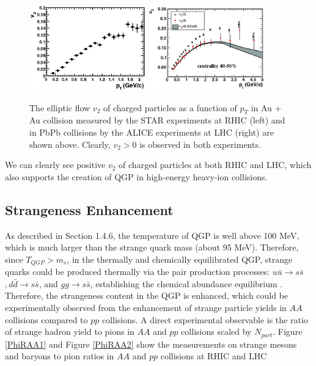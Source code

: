 \begin{figure}[hbtp]
\begin{center}
\includegraphics[width=0.45\textwidth]{Figures/Chapter1/STARV2Plot.eps}
\includegraphics[width=0.45\textwidth]{Figures/Chapter1/ALICEV2Plot.png}
\caption{The elliptic flow $v_2$ of charged particles as a function of $p_T$ in Au + Au collision measured by the STAR experiments at RHIC (left) and in PbPb collisions by the ALICE experiments at LHC (right) are shown above. Clearly, $v_2 > 0$ is observed in both experiments.}
\label{V2}
\end{center}
\end{figure}   

We can clearly see positive $v_2$ of charged particles at both RHIC and LHC, which also supports the creation of QGP in high-energy heavy-ion collisions.  
 
\subsection{Strangeness Enhancement} 

As described in Section 1.4.6, the temperature of QGP is well above 100 MeV, which is much larger than the strange quark mass (about 95 MeV). Therefore, since $T_{QGP} > m_s$, in the thermally and chemically equilibrated QGP, strange quarks could be produced thermally via the pair production processes: $u \bar u \rightarrow s\bar s$$, d \bar d \rightarrow s\bar s$, and $gg \rightarrow s \bar s$, establishing the chemical abundance equilibrium \cite{SSEnhance}. Therefore, the strangeness content in the QGP is enhanced, which could be experimentally observed from the enhancement of strange particle yields in $AA$ collisions compared to $pp$ collisions. A direct experimental observable is the ratio of strange hadron yield to pions in $AA$ and $pp$ collisions scaled by $N_{part}$. Figure \ref{PhiRAA1} and Figure \ref{PhiRAA2} show the measurements on strange mesons and baryons to pion ratios in $AA$ and $pp$ collisions at RHIC \cite{StrangeSTAR} and LHC \cite{StrangeALICE} 


